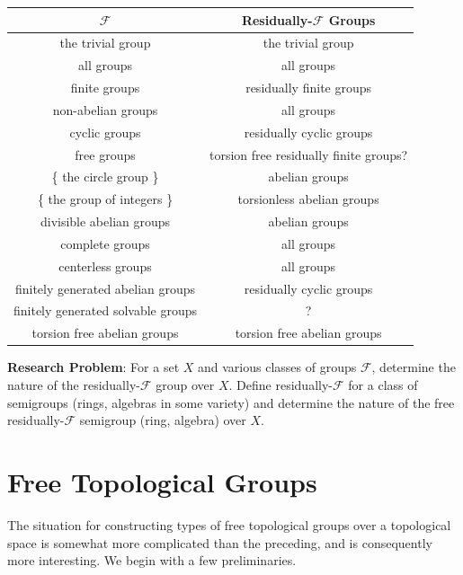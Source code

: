 \documentclass{article}
\begin{document}
\begin{center} 
\begin{tabular}{|c|c|}
\hline
$\mathcal{F}$                      & Residually-$\mathcal{F}$ Groups \\
\hline
the trivial group                  & the trivial group \\
all groups                         & all groups \\
finite groups                      & residually finite groups \\
non-abelian groups                 & all groups \\
cyclic groups                      & residually cyclic groups \\
free groups                        & torsion free residually finite groups? \\
\{ the circle group \}             & abelian groups \\
\{ the group of integers \}        & torsionless abelian groups \\
divisible abelian groups           & abelian groups \\
complete groups                    & all groups \\
centerless groups                  & all groups \\
finitely generated abelian groups  & residually cyclic groups \\
finitely generated solvable groups & ? \\
torsion free abelian groups        & torsion free abelian groups \\
\hline
\end{tabular} 
\end{center}
\vspace{0.3cm}

\textbf{Research Problem}: For a set $X$ and various classes of groups $\mathcal{F}$, determine the nature of the residually-$\mathcal{F}$ group over $X$. Define residually-$\mathcal{F}$ for a class of semigroups (rings, algebras in some variety) and determine the nature of the free residually-$\mathcal{F}$ semigroup (ring, algebra) over $X$.



\section{Free Topological Groups}

The situation for constructing types of free topological groups over a topological space is somewhat more complicated than the preceding, and is consequently more interesting. We begin with a few preliminaries.
\end{document}
